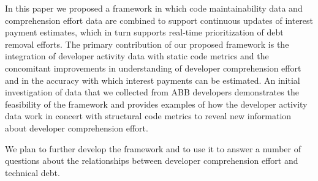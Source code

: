 In this paper we proposed a framework in which code maintainability data and comprehension effort data are combined to support continuous updates of interest payment estimates, which in turn supports real-time prioritization of debt removal efforts. The primary contribution of our proposed framework is the integration of developer activity data with static code metrics and the concomitant improvements in understanding of developer comprehension effort and in the accuracy with which interest payments can be estimated. An initial investigation of data that we collected from ABB developers demonstrates the feasibility of the framework and provides examples of how the developer activity data work in concert with structural code metrics to reveal new information about developer comprehension effort.

We plan to further develop the framework and to use it to answer a number of questions about the relationships between developer comprehension effort and technical debt.